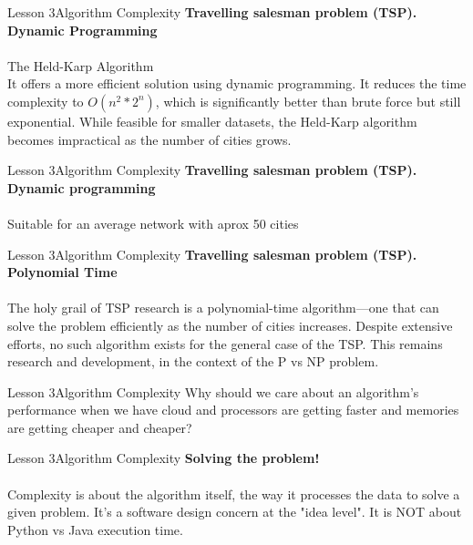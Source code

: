 \documentclass[aspectratio=1610]{beamer}
\begin{document}
\begin{frame}{Lesson 3}{Algorithm Complexity}
\LARGE
\textbf{Travelling salesman problem (TSP). Dynamic Programming}\\~\\
The Held-Karp Algorithm\\
\Large
It offers a more efficient solution using dynamic programming. It reduces 
the time complexity to $O(n^2 * 2^n)$, which is significantly better than 
brute force but still exponential. While feasible for smaller datasets, 
the Held-Karp algorithm becomes impractical as the number of cities grows.
\end{frame}


\begin{frame}{Lesson 3}{Algorithm Complexity}
\LARGE
\textbf{Travelling salesman problem (TSP). Dynamic programming}\\~\\
Suitable for an average network with aprox 50 cities
\end{frame}


\begin{frame}{Lesson 3}{Algorithm Complexity}
\LARGE
\textbf{Travelling salesman problem (TSP). Polynomial Time}\\~\\
The holy grail of TSP research is a polynomial-time algorithm—one that can solve
the problem efficiently as the number of cities increases. Despite extensive
efforts, no such algorithm exists for the general case of the TSP. This remains 
research and development, in the context of the P vs NP problem.
\end{frame}



\begin{frame}{Lesson 3}{Algorithm Complexity}
\huge
Why should we care about an algorithm's performance when we have cloud and
processors are getting faster and memories are getting cheaper and cheaper?
\end{frame}


\begin{frame}{Lesson 3}{Algorithm Complexity}
\LARGE
\textbf{Solving the problem!}\\~\\
Complexity is about the algorithm itself, the way it processes the data to 
solve a given problem. It's a software design concern at the "idea level". 
It is NOT about Python vs Java execution time.
\end{frame}
\end{document}
